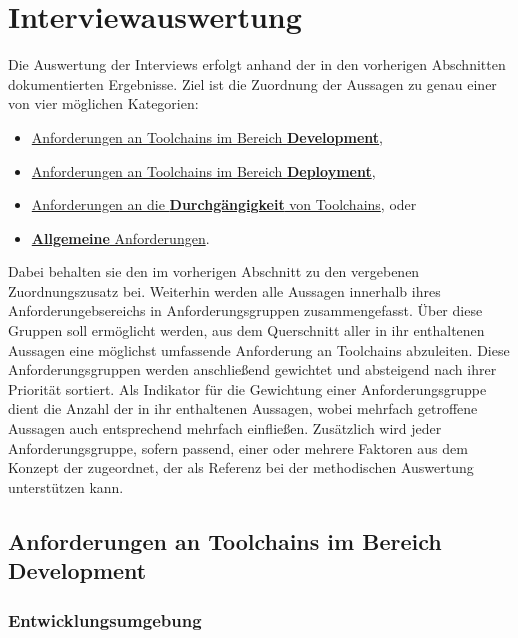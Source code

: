 \section{Interviewauswertung}
\label{sec:AA-04_interview-evaluation}

Die Auswertung der Interviews erfolgt anhand der in den vorherigen Abschnitten dokumentierten Ergebnisse. Ziel ist die Zuordnung der Aussagen zu genau einer von vier möglichen Kategorien:

\begin{itemize}
    \item \hyperref[subsec:AA-04-01_requirements-development]{Anforderungen an Toolchains im Bereich \textbf{Development}},
    \item \hyperref[subsec:AA-04-02_requirements-deployment]{Anforderungen an Toolchains im Bereich \textbf{Deployment}},
    \item \hyperref[subsec:AA-04-03_requirements-continuity]{Anforderungen an die \textbf{Durchgängigkeit} von Toolchains}, oder
    \item \hyperref[subsec:AA-04-04_requirements-general]{\textbf{Allgemeine} Anforderungen}.
\end{itemize}

Dabei behalten sie den im vorherigen Abschnitt zu den  vergebenen Zuordnungszusatz bei. Weiterhin werden alle Aussagen innerhalb ihres Anforderungebsereichs in Anforderungsgruppen zusammengefasst. Über diese Gruppen soll ermöglicht werden, aus dem Querschnitt aller in ihr enthaltenen Aussagen eine möglichst umfassende Anforderung an Toolchains abzuleiten. Diese Anforderungsgruppen werden anschließend gewichtet und absteigend nach ihrer Priorität sortiert. Als Indikator für die Gewichtung einer Anforderungsgruppe dient die Anzahl der in ihr enthaltenen Aussagen, wobei mehrfach getroffene Aussagen auch entsprechend mehrfach einfließen. Zusätzlich wird jeder Anforderungsgruppe, sofern passend, einer oder mehrere Faktoren aus dem Konzept der  zugeordnet, der als Referenz bei der methodischen Auswertung unterstützen kann.

\subsection{Anforderungen an Toolchains im Bereich Development}
\label{subsec:AA-04-01_requirements-development}

\subsubsection{Entwicklungsumgebung}
\label{subsubsec:AA-04-01-01_req-dev-development-environment}

